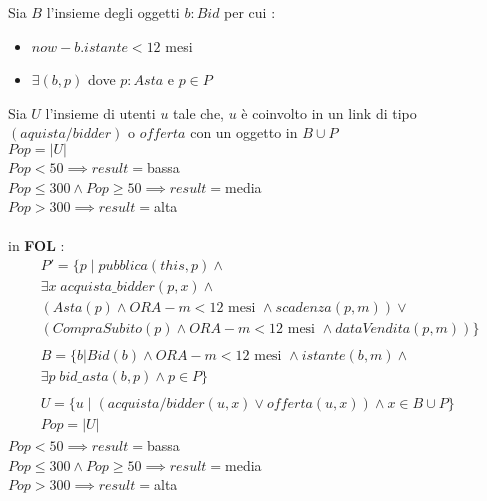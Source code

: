 \documentclass[12pt, letterpaper]{article}
\newcommand{\acc}{\\\hphantom{}\\}
\begin{document}
\begin{itemize}
            Sia $B$ l'insieme degli oggetti $b:Bid$ per cui : \begin{itemize}
                \item $now - b.istante < 12$ mesi 
                \item $\exists (b,p)$ dove $p:Asta$ e $p\in P$
            \end{itemize}
            Sia $U$ l'insieme di utenti $u$ tale che, $u$ è coinvolto in un link di tipo $(aquista/bidder)$ o $offerta$ con un 
            oggetto in $B\cup P$\\
            $Pop = |U|$\\
            $Pop<50\implies result = $bassa \\
            $Pop\le300\land Pop\ge50\implies result = $media\\ 
            $Pop>300\implies result =$alta\acc 
            in \textbf{FOL} :$$\begin{matrix}
                P' = \big\{ p \;|\;pubblica(this,p) \land \\ \exists x \;acquista\_bidder(p,x) \land \\ 
                (Asta(p) \land ORA-m<12\text{ mesi } \land scadenza(p,m)) \lor \\ 
                (CompraSubito(p) \land ORA-m<12\text{ mesi }  \land dataVendita(p,m)) \big\}\\ \\
                B =  \big\{ b | Bid(b) \land  ORA-m<12\text{ mesi } \land istante(b,m)\land \\ 
                \exists p\; bid\_asta(b,p) \land p\in P \big\}\\ \\ 
                U =  \big\{ u \;|\;( acquista/bidder(u,x) \lor offerta(u,x)) \land x\in B\cup P \big\}\\ 
                Pop=|U| 
            \end{matrix} $$
            $Pop<50\implies result = $bassa \\
            $Pop\le300\land Pop\ge50\implies result = $media\\ 
            $Pop>300\implies result =$alta
\end{itemize}
\end{document}

